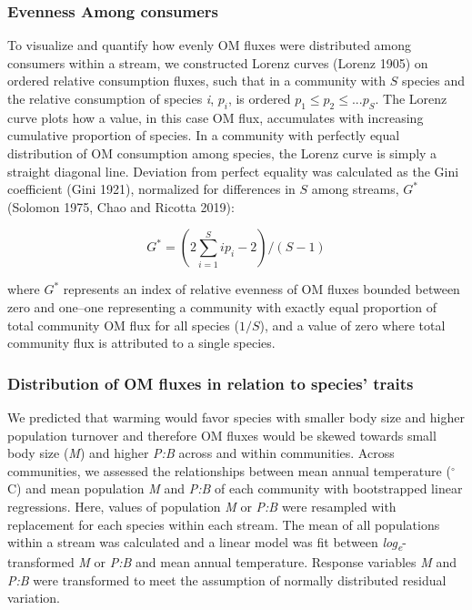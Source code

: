 \documentclass[
]{article}
\begin{document}
\hypertarget{evenness-among-consumers}{%
\subsubsection{Evenness Among
consumers}\label{evenness-among-consumers}}

To visualize and quantify how evenly OM fluxes were distributed among
consumers within a stream, we constructed Lorenz curves (Lorenz 1905) on
ordered relative consumption fluxes, such that in a community with \(S\)
species and the relative consumption of species \emph{i}, \(p_i\), is
ordered \(p_1 \leq p_2 \leq ... p_S\). The Lorenz curve plots how a
value, in this case OM flux, accumulates with increasing cumulative
proportion of species. In a community with perfectly equal distribution
of OM consumption among species, the Lorenz curve is simply a straight
diagonal line. Deviation from perfect equality was calculated as the
Gini coefficient (Gini 1921), normalized for differences in \(S\) among
streams, \(G^*\) (Solomon 1975, Chao and Ricotta 2019):

\[ G^* = (2 \sum_{i = 1}^S ip_i -2)/(S-1)\]

where \(G^*\) represents an index of relative evenness of OM fluxes
bounded between zero and one--one representing a community with exactly
equal proportion of total community OM flux for all species (\(1/S\)),
and a value of zero where total community flux is attributed to a single
species.

\hypertarget{distribution-of-om-fluxes-in-relation-to-species-traits}{%
\subsubsection{Distribution of OM fluxes in relation to species'
traits}\label{distribution-of-om-fluxes-in-relation-to-species-traits}}

We predicted that warming would favor species with smaller body size and
higher population turnover and therefore OM fluxes would be skewed
towards small body size (\emph{M}) and higher \emph{P:B} across and
within communities. Across communities, we assessed the relationships
between mean annual temperature (\(^\circ\)C) and mean population
\emph{M} and \emph{P:B} of each community with bootstrapped linear
regressions. Here, values of population \emph{M} or \emph{P:B} were
resampled with replacement for each species within each stream. The mean
of all populations within a stream was calculated and a linear model was
fit between \emph{log\textsubscript{e}}-transformed \emph{M} or
\emph{P:B} and mean annual temperature. Response variables \emph{M} and
\emph{P:B} were transformed to meet the assumption of normally
distributed residual variation.
\end{document}
